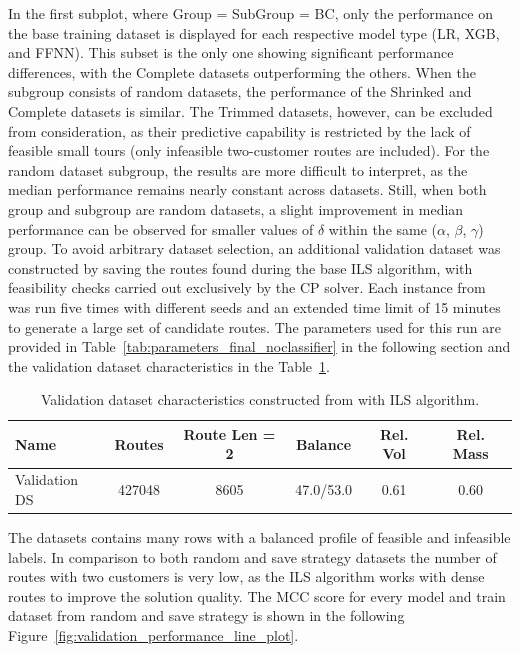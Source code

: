 In the first subplot, where Group = SubGroup = BC, only the performance on the base training dataset is
displayed for each respective model type (\gls{LR}, XGB, and \gls{FFNN}). This subset is the only one showing significant
performance differences, with the Complete datasets outperforming the others. When the subgroup consists of random datasets,
the performance of the Shrinked and Complete datasets is similar. The Trimmed datasets, however, can be excluded from consideration,
as their predictive capability is restricted by the lack of feasible small tours (only infeasible two-customer routes are included).
For the random dataset subgroup, the results are more difficult to interpret, as the median performance remains nearly constant
across datasets. Still, when both group and subgroup are random datasets, a slight improvement in median performance can
be observed for smaller values of $\delta$ within the same ($\alpha$, $\beta$, $\gamma$) group. To avoid arbitrary dataset
selection, an additional validation dataset was constructed by saving the routes found during the base \gls{ILS} algorithm,
with feasibility checks carried out exclusively by the \gls{CP} solver. Each instance from \gendreauDataSetText was run
five times with different seeds and an extended time limit of 15 minutes to generate a large set of candidate routes.
The parameters used for this run are provided in Table~\ref{tab:parameters_final_noclassifier} in the following section and
the validation dataset characteristics in the Table~\ref{tab:validation_dataset_gendreau}.
\begin{table}[!h]
	\centering
	\small
	\begin{tabular}{l c c c c c }
		\toprule
		Name          & Routes & Route Len = 2 & Balance   & Rel. Vol & Rel. Mass \\
		\midrule
		Validation DS & 427048 & 8605          & 47.0/53.0 & 0.61     & 0.60      \\
		\bottomrule
	\end{tabular}
	\caption{Validation dataset characteristics constructed from \gendreauDataSetText with ILS algorithm.}
	\label{tab:validation_dataset_gendreau}
\end{table}

The datasets contains many rows with a balanced profile of feasible and infeasible labels. In comparison to both
random and save strategy datasets the number of routes with two customers is very low, as the \gls{ILS} algorithm
works with dense routes to improve the solution quality. The \gls{MCC} score for every model and train dataset
from random and save strategy is shown in the following Figure~\ref{fig:validation_performance_line_plot}.

